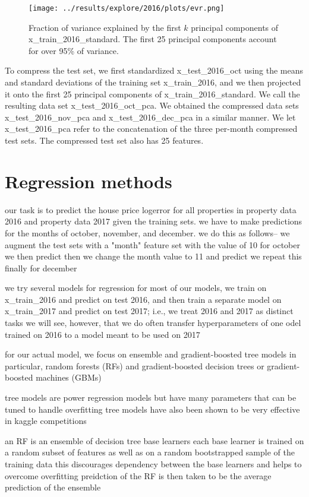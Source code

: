 \documentclass[12pt]{article}
\begin{document}
\begin{figure}
\centering
\texttt{[image: ../results/explore/2016/plots/evr.png]}
\caption{\label{fig-evr} Fraction of variance explained by the first $k$ principal components of x\_train\_2016\_standard. The first 25 principal components account for over 95\% of variance.}
\end{figure}

To compress the test set, we first standardized x\_test\_2016\_oct using the means and standard deviations of the training set x\_train\_2016, and we then projected it onto the first 25 principal components of x\_train\_2016\_standard. We call the resulting data set x\_test\_2016\_oct\_pca. We obtained the compressed data sets x\_test\_2016\_nov\_pca and x\_test\_2016\_dec\_pca in a similar manner. We let x\_test\_2016\_pca refer to the concatenation of the three per-month compressed test sets. The compressed test set also has 25 features.


\section{Regression methods}

our task is to predict the house price logerror for all properties in property data 2016 and property data 2017 given the training sets. we have to make predictions for the months of october, november, and december.
we do this as follows--
we augment the test sets with a "month" feature set with the value of 10 for october
we then predict
then we change the month value to 11 and predict
we repeat this finally for december

we try several models for regression
for most of our models, we train on x_train_2016 and predict on test 2016, and then train a separate model on x_train_2017 and predict on test 2017;
i.e., we treat 2016 and 2017 as distinct tasks
we will see, however, that we do often transfer hyperparameters of one odel trained on 2016 to a model meant to be used on 2017

for our actual model, we focus on ensemble and gradient-boosted tree models
in particular, random forests (RFs) and gradient-boosted decision trees or gradient-boosted machines (GBMs)

tree models are power regression models but have many parameters that can be tuned to handle overfitting
tree models have also been shown to be very effective in kaggle competitions

an RF is an ensemble of decision tree base learners
each base learner is trained on a random subset of features as well as on a random bootstrapped sample of the training data
this discourages dependency between the base learners and helps to overcome overfitting
preidction of the RF is then taken to be the average prediction of the ensemble
\end{document}
